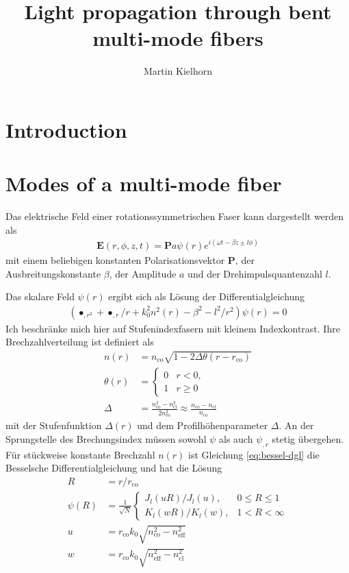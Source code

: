\documentclass[DIV19,twocolumn]{scrartcl}
\title{Light propagation through bent multi-mode fibers} %
\author{Martin Kielhorn}
\newcommand{\vect}[1]{\mathbf{#1}}
\def\E{\vect E}
\def\P{\vect P}
\def\({\left(}
\def\){\right)}
\newcommand{\nco}{n_\textrm{co}}
\newcommand{\rco}{r_\textrm{co}}
\newcommand{\neff}{n_\textrm{eff}}
\newcommand{\ncl}{n_\textrm{cl}}
\begin{document}
\maketitle
\section{Introduction}
\section{Modes of a multi-mode fiber}
Das elektrische Feld einer rotationssymmetrischen Faser kann dargestellt werden als
\begin{align}
\E(r,\phi,z,t)=\P a \psi(r) e^{i(\omega t-\beta z \pm l \phi)}
\end{align}
mit einem beliebigen konstanten Polarisationsvektor $\P$, der
Ausbreitungskonstante $\beta$, der Amplitude $a$ und der
Drehimpulsquantenzahl $l$.

Das skalare Feld $\psi(r)$ ergibt sich als L\"osung der Differentialgleichung
\begin{align}
\label{eq:bessel-dgl}
\(\bullet_{,r^2} + \bullet_{,r}/r +k_0^2 n^2(r) -\beta^2 -l^2/r^2\)\psi(r) = 0
\end{align}
Ich beschr\"anke mich hier auf Stufenindexfasern mit kleinem
Indexkontrast. Ihre Brechzahlverteilung ist definiert als
\begin{align}
n(r)&=\nco\sqrt{1-2\Delta\theta(r-\rco)} \\
\theta(r)&=\begin{cases}0 &r<0,\\ 1 & r\ge 0\end{cases} \\
\Delta &= \frac{\nco^2-\ncl^2}{2\nco^2} \approx \frac{\nco-\ncl}{\nco}
\end{align}
mit der Stufenfunktion $\Delta(r)$ und dem Profilh\"ohenparameter
$\Delta$. An der Sprungstelle des Brechungsindex m\"ussen sowohl
$\psi$ als auch $\psi_{,r}$ stetig \"ubergehen. F\"ur st\"uckweise konstante Brechzahl $n(r)$ ist Gleichung \eqref{eq:bessel-dgl} die Besselsche Differentialgleichung und hat die L\"osung
\begin{align}
  R&=r/\rco\\
  \psi(R)&=\frac{1}{\sqrt{N}}\begin{cases}
  J_l(uR)/J_l(u), & 0\le R\le 1\\
  K_l(wR)/K_l(w), & 1<R<\infty 
  \end{cases}\label{eq:psi}\\
  u &= \rco k_0 \sqrt{\nco^2-\neff^2} \\
  w &= \rco k_0 \sqrt{\neff^2-\ncl^2} 
\end{align}
\end{document}
